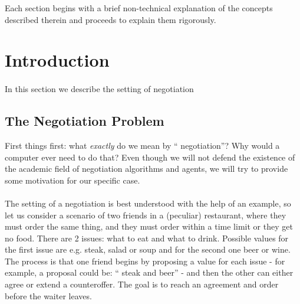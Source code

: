 \documentclass[12pt]{article}
\numberwithin{equation}{section}
\newcommand{\quotes}[1]{\textquotedblleft{} #1\textquotedblright}
\begin{document}
			Each section begins with a brief non-technical explanation of the concepts described therein and proceeds to explain them rigorously.

	\newpage

	\tableofcontents

	\newpage

	\section{Introduction}		\label{sec:introduction}

		\paragraph*{}
		In this section we describe the setting of negotiation 

		\subsection{The Negotiation Problem}	\label{sec:introduction.the_negotiation_problem}	%
			First things first: what \emph{exactly} do we mean by \quotes{negotiation}? Why would a computer ever need to do that? Even though we will not defend the existence of the academic field of negotiation algorithms and agents, we will try to provide some motivation for our specific case.	%

			\paragraph*{}
				The setting of a negotiation is best understood with the help of an example, so let us consider a scenario of two friends in a (peculiar) restaurant, where they must order the same thing, and they must order within a time limit or they get no food. There are 2 issues: what to eat and what to drink. Possible values for the first issue are e.g. steak, salad or soup and for the second one beer or wine. The process is that one friend begins by proposing a value for each issue - for example, a proposal could be: \quotes{steak and beer} - and then the other can either agree or extend a counteroffer. The goal is to reach an agreement and order before the waiter leaves.
			
\end{document}
